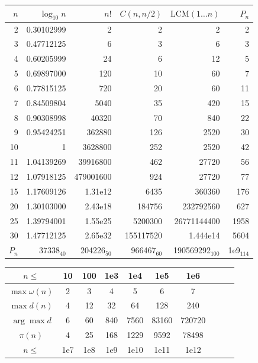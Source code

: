 \begin{table}[H]
	\centering
	\small
	\renewcommand\arraystretch{0.8}
	\begin{tabular}{|r|r|r|r|r|r|}
		\hline
		\rowcolor{black!10} $n$ & $\log_{10} n$ & $n!$ & $C(n,n/2)$ & $\mathrm{LCM}(1\dots n)$ & $P_n$\\
		\hline
		2 & 0.30102999 & 2 & 2 & 2 & 2\\
		\hline
		3 & 0.47712125 & 6 & 3 & 6 & 3\\
		\hline
		4 & 0.60205999 & 24 & 6 & 12 & 5\\
		\hline
		5 & 0.69897000 & 120 & 10 & 60 & 7\\
		\hline
		6 & 0.77815125 & 720 & 20 & 60 & 11\\
		\hline
		7 & 0.84509804 & 5040 & 35 & 420 & 15\\
		\hline
		8 & 0.90308998 & 40320 & 70 & 840 & 22\\
		\hline
		9 & 0.95424251 & 362880 & 126 & 2520 & 30\\
		\hline
		10 & 1 & 3628800 & 252  & 2520 & 42\\
		\hline
		11 & 1.04139269 & 39916800 & 462  & 27720 & 56\\
		\hline
		12 & 1.07918125 & 479001600 & 924 & 27720 & 77\\
		\hline
		15 & 1.17609126 & 1.31e{12} & 6435 & 360360 & 176\\
		\hline
		20 & 1.30103000 & 2.43e{18} & 184756 & 232792560 & 627\\
		\hline
		25 & 1.39794001 & 1.55e{25} & 5200300 & 26771144400 & 1958\\
		\hline
		30 & 1.47712125 & 2.65e{32} & 155117520 & 1.444e{14} & 5604\\
		\hline
		$P_n$ & 37338$_{40}$ & 204226$_{50}$ & 966467$_{60}$ & 190569292$_{100}$ & 1e{9}$_{114}$\\
		\hline
	\end{tabular}
		\begin{tabular}{|c|c|c|c|c|c|c|c|c|c|}
			\hline
			\rowcolor{black!10} $n \leq$ & 10 &  100 & 1e3 & 1e4 & 1e5 & 1e6 \\
			\hline
			$\max\omega(n)$ & 2 & 3 & 4 & 5 & 6 & 7  \\
			\hline
			$\max{d(n)}$ & 4 & 12 & 32 & 64 & 128 & 240 \\
			\hline
			$\arg\max d$ & 6 & 60 & 840 & 7560 & 83160 & 720720 \\
			\hline
			$\pi(n)$ & 4 & 25 & 168 & 1229 & 9592 & 78498 \\
			\hline
			\rowcolor{black!10} $n \leq$ & 1e7 & 1e8 & 1e9 & 1e10 & 1e11& 1e12\\

\end{tabular}
\end{table}
